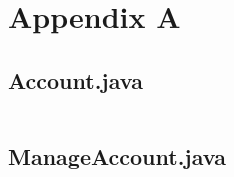 \documentclass[english,a4paper,]{report}
\begin{document}
\inputminted[firstline=16,lastline=22]{java}{code_samples/Account.java}

\inputminted[firstline=62,lastline=68]{java}{code_samples/Account.java}

\chapter{Appendix A}\label{appendix-a}

\section{Account.java}\label{account.java}

\inputminted{java}{code_samples/Account.java}

\section{ManageAccount.java}\label{manageaccount.java}

\inputminted{java}{code_samples/ManageAccount.java}
\end{document}
